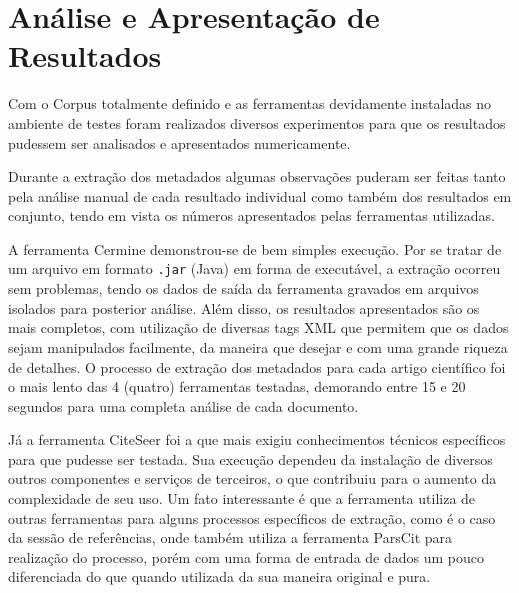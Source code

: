 
\chapter{Análise e Apresentação de Resultados}
\label{cha:results}



Com o Corpus totalmente definido e as ferramentas devidamente instaladas no ambiente de testes foram realizados diversos experimentos para que os resultados pudessem ser analisados e apresentados numericamente.


Durante a extração dos metadados algumas observações puderam ser feitas tanto pela análise manual de cada resultado individual como também dos resultados em conjunto, tendo em vista os números apresentados pelas ferramentas utilizadas.

A ferramenta Cermine demonstrou-se de bem simples execução. 
Por se tratar de um arquivo em formato \texttt{.jar} (Java) em forma de executável, a extração ocorreu sem problemas, tendo os dados de saída da ferramenta gravados em arquivos isolados para posterior análise. 
Além disso, os resultados apresentados são os mais completos, com utilização de diversas tags XML que permitem que os dados sejam manipulados facilmente, da maneira que desejar e com uma grande riqueza de detalhes. O processo de extração dos metadados para cada artigo científico foi o mais lento das 4 (quatro) ferramentas testadas, demorando entre 15 e 20 segundos para uma completa análise de cada documento.

Já a ferramenta CiteSeer foi a que mais exigiu conhecimentos técnicos específicos para que pudesse ser testada. Sua execução dependeu da instalação de diversos outros componentes e serviços de terceiros, o que contribuiu para o aumento da complexidade de seu uso. Um fato interessante é que a ferramenta utiliza de outras ferramentas para alguns processos específicos de extração, como é o caso da sessão de referências, onde também utiliza a ferramenta ParsCit para realização do processo, porém com uma forma de entrada de dados um pouco diferenciada do que quando utilizada da sua maneira original e pura.

